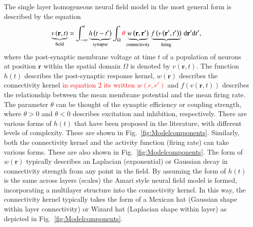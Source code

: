 \documentclass[review,authoryear,3p]{elsarticle}
\newcommand{\parham}[1]{\textcolor{red}{#1}}
\begin{document}
The single layer homogeneous neural field model in the most general form is described by the equation
\begin{equation}
	\label{FullDoubleIntModel} \underbrace{v\left(\mathbf{r},t\right)}_{\text{field}} =
	\int_{-\infty}^t 
	\underbrace{h\left(t - t'\right)}_{\text{synapse}} \int_\Omega
	\parham{\theta}\underbrace{w\left(\mathbf{r},\mathbf{r}'\right)}_{\text{connectivity}} 
	\underbrace{f\left( v\left( \mathbf{r}',t' \right)\right)}_{\text{firing}}
	\, \mathrm{d}\mathbf{r}'\mathrm{d}t',
\end{equation}
where the post-synaptic membrane voltage at time $t$ of a population of neurons at position $\mathbf r$ within the spatial domain $\Omega$ is denoted by $v\left(\mathbf r,t\right)$. The function $h(t)$ describes the post-synaptic response kernel, $w(\mathbf{r})$ describes the connectivity kernel \parham{in equation 2 its written $w(r,r')$} and $f(v(\mathbf{r},t))$ describes the relationship between the mean membrane potential and the mean firing rate. The parameter $\theta$ can be thought of the synaptic efficiency or coupling strength, where $\theta>0$ and $\theta<0$ describes excitation and inhibition, respectively. There are various forms of $h(t)$ that have been proposed in the literature, with different levels of complexity. These are shown in Fig.~\ref{fig:Modelcomponents}. Similarly, both the connectivity kernel and the activity function (firing rate) can take various forms. These are also shown in Fig.~\ref{fig:Modelcomponents}. The form of $w(\mathbf{r})$ typically describes an Laplacian (exponential) or Gaussian decay in connectivity strength from any point in the field. By assuming the form of $h(t)$ is the same across layers (scales) the Amari style neural field model is formed, incorporating a multilayer structure into the connectivity kernel. In this way, the connectivity kernel typically takes the form of a Mexican hat (Gaussian shape within layer connectivity) or Wizard hat (Laplacian shape within layer) as depicted in Fig.~\ref{fig:Modelcomponents}.
\end{document}
